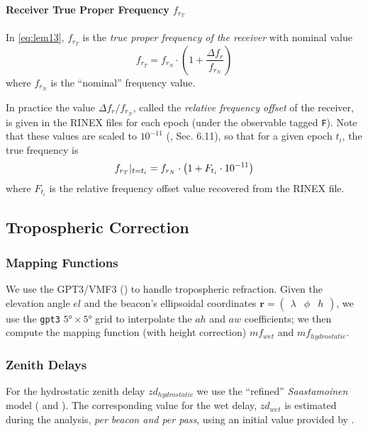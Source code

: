 \paragraph{Receiver True Proper Frequency $f_{r_T}$}\label{par:receiver-true-proper-frequency}
In \autoref{eq:lem13}, $f_{r_T}$ is the \emph{true proper frequency of 
the receiver} with nominal value 
\begin{equation}\label{eq:frt-gen}
  f_{r_T} = f_{r_N} \cdot \left( 1 + \frac{\Delta f_r}{f_{r_N}} \right)
\end{equation}
where $f_{r_N}$ is the ``nominal'' frequency value.

In practice the value $\Delta f_r / f_{r_N}$, called the \emph{relative 
frequency offset} of the receiver, is given in the RINEX files for each epoch 
(under the observable tagged \texttt{F}). Note that these values are scaled to 
$10^{-11}$ (\cite{DORISRNX3}, Sec. 6.11), so that for a given epoch $t_i$, the 
true frequency is
\begin{equation}\label{eq:frt-rinex}
  f_{r_T}|_{t=t_i} = f_{r_N} \cdot \left( 1 + F_{t_i} \cdot 10^{-11} \right)
\end{equation}
where $F_{t_i}$ is the relative frequency offset value recovered from the RINEX 
file.

\iffalse
\subsection{Tropospheric Correction}\label{ssec-tropospheric-correction}
\subsubsection{Mapping Functions}
We use the GPT3/VMF3 (\cite{Landskron2018}) to handle tropospheric refraction. 
Given the elevation angle $el$ and the beacon's ellipsoidal coordinates 
$\bm{r}=\begin{pmatrix} \lambda & \phi & h\end{pmatrix}$, we use the \texttt{gpt3} 
$\ang{5} \times \ang{5}$ grid to interpolate the $ah$ and $aw$ coefficients; 
we then compute the mapping function (with height correction) $mf_{wet}$ and 
$mf_{hydrostatic}$.

\subsubsection{Zenith Delays}
For the hydrostatic zenith delay $zd_{hydrostatic}$ we use the ``refined'' 
\emph{Saastamoinen} model (\cite{Davisetal85} and \cite{Saastamoinen72}). 
The corresponding value for the wet delay, $zd_{wet}$ is estimated during the 
analysis, \emph{per beacon and per pass}, using an initial value provided by 
\cite{Askneetal87}.


